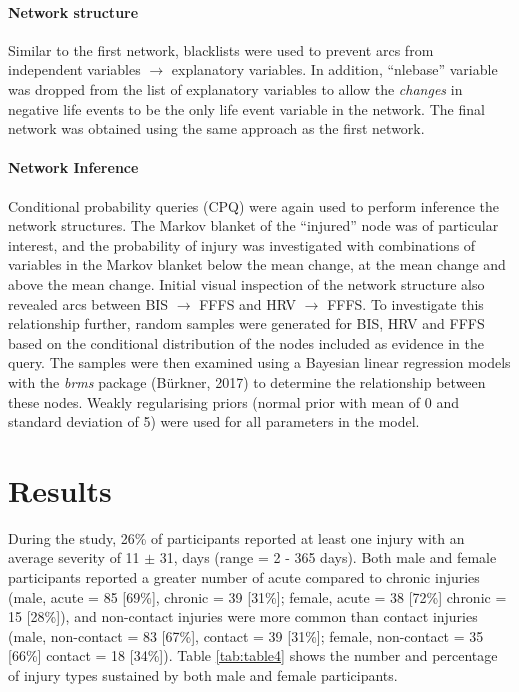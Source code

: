 \documentclass[
]{frontiersHLTH}
\begin{document}
\hypertarget{network-structure-1}{%
\paragraph{Network structure}\label{network-structure-1}}

Similar to the first network, blacklists were used to prevent arcs from
independent variables \(\rightarrow\) explanatory variables. In
addition, ``nlebase'' variable was dropped from the list of explanatory
variables to allow the \emph{changes} in negative life events to be the
only life event variable in the network. The final network was obtained
using the same approach as the first network.

\hypertarget{network-inference-1}{%
\paragraph{Network Inference}\label{network-inference-1}}

Conditional probability queries (CPQ) were again used to perform
inference the network structures. The Markov blanket of the ``injured''
node was of particular interest, and the probability of injury was
investigated with combinations of variables in the Markov blanket below
the mean change, at the mean change and above the mean change. Initial
visual inspection of the network structure also revealed arcs between
BIS \(\rightarrow\) FFFS and HRV \(\rightarrow\) FFFS. To investigate
this relationship further, random samples were generated for BIS, HRV
and FFFS based on the conditional distribution of the nodes included as
evidence in the query. The samples were then examined using a Bayesian
linear regression models with the \emph{brms} package (Bürkner, 2017) to
determine the relationship between these nodes. Weakly regularising
priors (normal prior with mean of 0 and standard deviation of 5) were
used for all parameters in the model.

\hypertarget{results}{%
\section{Results}\label{results}}

During the study, 26\% of participants reported at least one injury with
an average severity of 11 \(\pm\) 31, days (range = 2 - 365 days). Both
male and female participants reported a greater number of acute compared
to chronic injuries (male, acute = 85 {[}69\%{]}, chronic = 39
{[}31\%{]}; female, acute = 38 {[}72\%{]} chronic = 15 {[}28\%{]}), and
non-contact injuries were more common than contact injuries (male,
non-contact = 83 {[}67\%{]}, contact = 39 {[}31\%{]}; female,
non-contact = 35 {[}66\%{]} contact = 18 {[}34\%{]}). Table
\ref{tab:table4} shows the number and percentage of injury types
sustained by both male and female participants.
\end{document}
